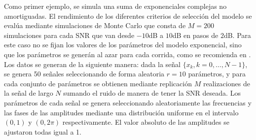 Como primer ejemplo, se simula una suma de exponenciales complejas no amortiguadas. El rendimiento de los diferentes criterios de selección del modelo se evalúa mediante simulaciones de Monte Carlo que consta de $M=200$ simulaciones para cada SNR que van desde $-10$dB a $10$dB en pasos de $2$dB. Para este caso no se fijan los valores de los parámetros del modelo exponencial, sino que los parámetros se generán al azar para cada corrida, como se recomienda en \cite{Stoica2004a}. Los datos se generan de  la siguiente manera: dada la señal $\{x_k, k=0,\ldots,N-1\}$, se genera 50 señales seleccionando de forma aleatoria $r=10$ parámetros, y para cada conjunto de parámetros se obtienen mediante replicación $M$ realizaciones de la señal de largo $N$ sumando el ruido de manera de tener la SNR deseada. Los parámetros de cada señal se genera seleccionando aleatoriamente las frecuencias y las fases de las amplitudes mediante una distribución uniforme en el intervalo $(0,1)$ y $(0,2\pi)$ respectivamente. El valor absoluto de las amplitudes se ajustaron todas igual a 1.


